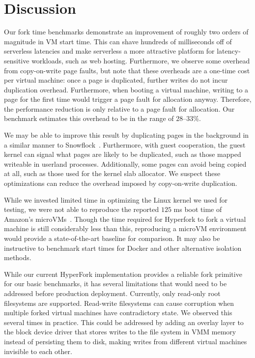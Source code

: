 \section{Discussion} \label{sec:discussion}

Our fork time benchmarks demonstrate an improvement of roughly two orders of
magnitude in VM start time. This can shave hundreds of milliseconds off of
serverless latencies and make serverless a more attractive platform for
latency-sensitive workloads, such as web hosting. Furthermore, we observe some
overhead from copy-on-write page faults, but note that these overheads are a
one-time cost per virtual machine: once a page is duplicated, further writes do
not incur duplication overhead. Furthermore, when booting a virtual machine,
writing to a page for the first time would trigger a page fault for allocation
anyway. Therefore, the performance reduction is only relative to a page fault
for allocation. Our benchmark estimates this overhead to be in the range of
$28$--$33$\%.

We may be able to improve this result by duplicating pages in the background in
a similar manner to Snowflock~\cite{snowflock}. Furthermore, with guest
cooperation, the guest kernel can signal what pages are likely to be
duplicated, such as those mapped writeable in userland processes. Additionally,
some pages can avoid being copied at all, such as those used for the kernel
slab allocator. We suspect these optimizations can reduce the overhead imposed
by copy-on-write duplication.

While we invested limited time in optimizing the Linux kernel we used for
testing, we were not able to reproduce the reported $125$ ms boot time of
Amazon's microVMs~\cite{firecracker-spec}. Though the time required for
Hyperfork to fork a virtual machine is still considerably less than this,
reproducing a microVM environment would provide a state-of-the-art baseline for
comparison. It may also be instructive to benchmark start times for Docker and
other alternative isolation methods.

 While our current HyperFork implementation
provides a reliable fork primitive for our basic benchmarks, it has several
limitations that would need to be addressed before production deployment.
Currently, only read-only root filesystems are supported. Read-write
filesystems can cause corruption when multiple forked virtual machines have
contradictory state. We observed this several times in practice. This could be
addressed by adding an overlay layer to the block device driver that stores
writes to the file system in VMM memory instead of persisting them to disk,
making writes from different virtual machines invisible to each other.

